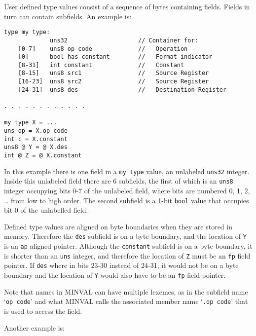 \documentclass[12pt]{article}
\newenvironment{indpar}[1][0.3in]%
	{\begin{list}{}%
		     {\setlength{\itemsep}{0in}%
		      \setlength{\topsep}{0in}%
		      \setlength{\parsep}{1ex}%
		      \setlength{\labelwidth}{#1}%
		      \setlength{\leftmargin}{#1}%
		      \addtolength{\leftmargin}{\labelsep}}%
	 \item}%
	{\end{list}}
\begin{document}
User defined type values consist of a sequence of bytes containing fields.
Fields in turn can contain subfields.
An example is:

\begin{indpar}\begin{verbatim}
type my type:
             uns32                    // Container for:
    [0-7]    uns8 op code             //   Operation
    [0]      bool has constant        //   Format indicator
    [8-31]   int constant             //   Constant
    [8-15]   uns8 src1                //   Source Register
    [16-23]  uns8 src2                //   Source Register
    [24-31]  uns8 des                 //   Destination Register

. . . . . . . . . . . .

my type X = ...
uns op = X.op code
int c = X.constant
uns8 @ Y = @ X.des
int @ Z = @ X.constant
\end{verbatim}\end{indpar}

In this example there is one field in a {\tt my type} value,
an unlabeled {\tt uns32} integer.
Inside this unlabeled field there are 6 subfields, the first of which is
an {\tt uns8} integer occupying bits 0-7 of the unlabeled field,
where bits are numbered 0, 1, 2, \ldots{} from
low to high order.  The second subfield is a 1-bit {\tt bool}
value that occupies bit 0 of the unlabelled field.

Defined type values are aligned on byte boundaries when
they are stored in memory.  Therefore the {\tt des} subfield
is on a byte boundary, and
the location of {\tt Y} is an {\tt ap} aligned pointer.  Although
the {\tt constant} subfield is on a byte boundary, it is
shorter than an {\tt uns} integer, and therefore the
location of {\tt Z} must be an {\tt fp} field pointer.
If {\tt des} where in bits 23-30 instead of 24-31, it would
not be on a byte boundary and the location of {\tt Y} would
also have to be an {\tt fp} field pointer.

Note that names in MINVAL can have multiple lexemes, as in
the subfield name `{\tt op code}' and what MINVAL calls the
associated member name `{\tt .op code}' that is used to access
the field.

Another example is:
\end{document}
